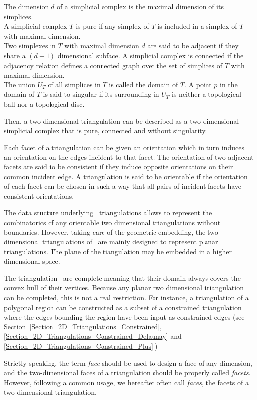 The dimension $d$ of a  simplicial complex is the 
maximal dimension of its simplices. \\
A simplicial complex $T$ is pure if any simplex of $T$
is included in a simplex of $T$ with maximal dimension. \\
Two simplexes in $T$ with maximal dimension $d$ are said to be
adjacent if they share a $(d-1)$ dimensional subface.
A simplicial complex is connected if the adjacency relation
defines a connected graph 
over  the set of simplices of $T$ with maximal dimension. \\
The union $U_T$ of all simplices in $T$ is called the domain of $T$.
A point $p$ in the domain of $T$ is said to singular 
if its surrounding in $U_T$
is neither a topological ball nor a topological disc.

Then, a two dimensional triangulation can be described as a 
two dimensional simplicial complex  that is pure,
connected and without singularity.

Each facet of a triangulation can be given an orientation
which in turn induces an orientation
on the edges incident to that facet. The orientation of two adjacent
facets are said to be consistent if they induce
opposite orientations on their common incident edge.
A triangulation is said to be orientable if 
the orientation of each facet can be chosen in such a way
that all pairs of incident facets have consistent orientations. 

The data stucture underlying \cgal\ triangulations
allows to represent the combinatorics of 
any  orientable two dimensional  triangulations
without boundaries. However, taking care
of the geometric embedding, 
the two dimensional triangulations of \cgal\ are  mainly
designed to represent planar triangulations.
The plane of the tiangulation may be embedded in a higher
dimensional space.

The  triangulation \cgal\ are complete
meaning that their domain always covers the
convex hull of  their vertices.
Because any planar  two dimensional triangulation
can be completed, this is not a real restriction.
For instance, a triangulation of a  polygonal region can be
constructed as a subset  of a constrained triangulation 
where the edges bounding the region have been input as 
constrained edges (see
Section~\ref{Section_2D_Triangulations_Constrained},
\ref{Section_2D_Triangulations_Constrained_Delaunay} and 
\ref{Section_2D_Triangulations_Constrained_Plus}.)

Strictly speaking, the term {\em face} should be used
to design  a face of any dimension,
and the two-dimensional faces of a triangulation 
should be properly called {\em facets}.
However, following a common usage, we hereafter often call {\em
faces}, the facets
of a two dimensional triangulation.

